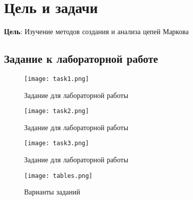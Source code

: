 \chapter{Цель и задачи}
\label{ch:intro}

\textbf{Цель}: Изучение методов создания и анализа цепей Маркова \\

\section*{Задание к лабораторной работе}

\begin{figure}[H]
    \centering
    \texttt{[image: task1.png]}
    \caption{Задание для лабораторной работы}
\end{figure}

\begin{figure}[H]
    \centering
    \texttt{[image: task2.png]}
    \caption{Задание для лабораторной работы}
\end{figure}

\begin{figure}[H] 
    \centering
    \texttt{[image: task3.png]}
    \caption{Задание для лабораторной работы}
\end{figure}

\begin{figure}[H]
    \centering
    \texttt{[image: tables.png]}
    \caption{Варианты заданий}
\end{figure}



\endinput